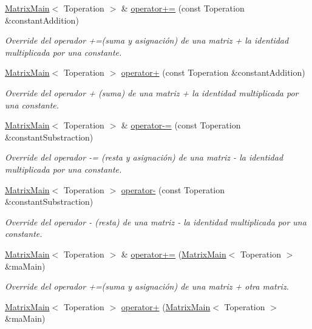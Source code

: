 \begin{DoxyCompactItemize}
\hyperlink{classMatrixMain}{Matrix\+Main}$<$ Toperation $>$ \& \hyperlink{classMatrixMain_a9c4235d9cb94762af7d7fcf9d3185ae5}{operator+=} (const Toperation \&constant\+Addition)
\begin{DoxyCompactList}\small\item\em Override del operador +=(suma y asignación) de una matriz + la identidad multiplicada por una constante. \end{DoxyCompactList}\item 
\hyperlink{classMatrixMain}{Matrix\+Main}$<$ Toperation $>$ \hyperlink{classMatrixMain_a0c1bc3c2ee26975fe979213d9d177608}{operator+} (const Toperation \&constant\+Addition)
\begin{DoxyCompactList}\small\item\em Override del operador + (suma) de una matriz + la identidad multiplicada por una constante. \end{DoxyCompactList}\item 
\hyperlink{classMatrixMain}{Matrix\+Main}$<$ Toperation $>$ \& \hyperlink{classMatrixMain_ac5c163a3002d2e8de1e05dcac5ea5df1}{operator-\/=} (const Toperation \&constant\+Substraction)
\begin{DoxyCompactList}\small\item\em Override del operador -\/= (resta y asignación) de una matriz -\/ la identidad multiplicada por una constante. \end{DoxyCompactList}\item 
\hyperlink{classMatrixMain}{Matrix\+Main}$<$ Toperation $>$ \hyperlink{classMatrixMain_a9105969d693cab31a797b1f5c7e63d69}{operator-\/} (const Toperation \&constant\+Substraction)
\begin{DoxyCompactList}\small\item\em Override del operador -\/ (resta) de una matriz -\/ la identidad multiplicada por una constante. \end{DoxyCompactList}\item 
\hyperlink{classMatrixMain}{Matrix\+Main}$<$ Toperation $>$ \& \hyperlink{classMatrixMain_ac4f89e678cec819cbeffdf363a4bf717}{operator+=} (\hyperlink{classMatrixMain}{Matrix\+Main}$<$ Toperation $>$ \&ma\+Main)
\begin{DoxyCompactList}\small\item\em Override del operador +=(suma y asignación) de una matriz + otra matriz. \end{DoxyCompactList}\item 
\hyperlink{classMatrixMain}{Matrix\+Main}$<$ Toperation $>$ \hyperlink{classMatrixMain_a16c27bc4800c921cc22ad5aa3c159b11}{operator+} (\hyperlink{classMatrixMain}{Matrix\+Main}$<$ Toperation $>$ \&ma\+Main)

\end{DoxyCompactItemize}
